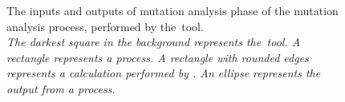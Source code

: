 \begin{figure}[t]
\begin{tikzpicture}[thick,scale=0.85, every node/.style={scale=0.85}]
%
%
\end{tikzpicture}
\caption{\label{fig:mrstudyr}The inputs and outputs of mutation analysis phase
of the mutation analysis process, performed by the \mr \,tool. \\
\textit{The darkest square in the background represents the \mr \,tool.
A rectangle represents a process. A rectangle with rounded edges represents a
calculation performed by \mr. An ellipse represents the output from a process.}}
\end{figure}
